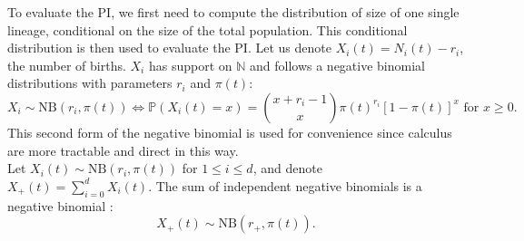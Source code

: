 \documentclass{article}
\newcommand{\pr}{{\mathbb{P}}}
\begin{document}
  To evaluate the PI, we first need to compute the distribution of size of one single lineage, conditional on the size of the total population. This conditional distribution is then used to evaluate the PI.
 Let us denote $X_i(t)=N_i(t)-r_i$, the number of births. $X_i$ has support on $\mathbb{N}$ and follows a negative binomial distributions with parameters $r_i$ and $\pi(t)$:
\begin{equation}
X_i \sim \mathrm{NB}(r_i,\pi(t)) \iff \pr(X_i(t)=x)=\binom{x+r_i-1}{x} \pi(t)^{r_i} [1-\pi(t)]^{x} \text{ for } x \geq 0.
\end{equation}
This second form of the negative binomial is used for convenience since calculus are more tractable and direct in this way.\\

Let $X_i(t) \sim \mathrm{NB}(r_i,\pi(t))$ for $1 \leq i \leq d$, and denote $X_+(t)=\sum_{i=0}^d X_i(t)$. The sum of independent negative binomials is a negative binomial \cite{johnson2005univariate}:
\begin{equation}
 X_+(t)  \sim \mathrm{NB} \left( r_+, \pi(t) \right). \label{sumNB}
\end{equation}
\end{document}
